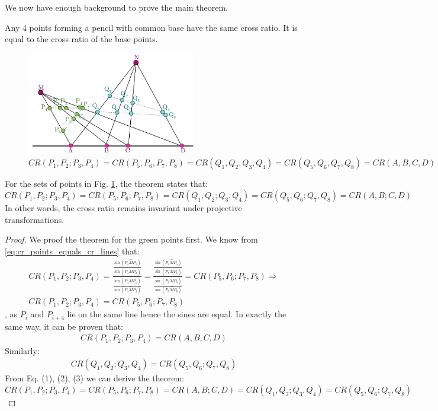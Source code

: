 \documentclass[a4paper]{article}
\begin{document}
We now have enough background to prove the main theorem.
\begin{theorem}
Any 4 points forming a pencil with common base have the same cross ratio. It is equal to the cross ratio of the base points.
\begin{figure}[H]
    \centering
    \includegraphics[height=4.5cm]{img/cross_ratio_pencils.png}
    \caption{$CR(P_1,P_2;P_3,P_4) = CR(P_5,P_6,P_7,P_8) =CR(Q_1,Q_2,Q_3,Q_4) = CR(Q_5,Q_6,Q_7,Q_8) = CR(A,B,C,D)$}
    \label{fig:cross_ratio_pencil}
\end{figure}
For the sets of points in Fig. \ref{fig:cross_ratio_pencil}, the theorem states that:
\begin{equation}
    CR(P_1,P_2;P_3,P_4) = CR(P_5,P_6;P_7,P_8) =CR(Q_1,Q_2;Q_3,Q_4) = CR(Q_5,Q_6;Q_7,Q_8) = CR(A,B;C,D)
\end{equation}
In other words, the cross ratio remains invariant under projective transformations.
\end{theorem}
\begin{proof}
We proof the theorem for the green points first. We know from \eqref{eq:cr_points_equals_cr_lines} that:
\begin{gather}
CR(P_1,P_2;P_3,P_4) =
\frac{\frac{\sin(P_3\hat{M}P_1)}{\sin(P_3\hat{M}P_2)}}   {\frac{\sin(P_4\hat{M}P_1)}{\sin(P_4\hat{M}P_2)}} = 
\frac{\frac{\sin(P_7\hat{M}P_5)}{\sin(P_8\hat{M}P_6)}}   {\frac{\sin(P_8\hat{M}P_5)}{\sin(P_8\hat{M}P_6)}} = 
CR(P_5,P_6;P_7,P_8) \Rightarrow \\
CR(P_1,P_2;P_3,P_4) = CR(P_5,P_6;P_7,P_8) \tag{1}
\end{gather}
, as $P_i$ and $P_{i+4}$ lie on the same line hence the sines are equal. In exactly the same way, it can be proven that:
\begin{gather}
CR(P_1,P_2;P_3,P_4) = CR(A,B,C,D)  \tag{2}  
\end{gather}
Similarly:
\begin{gather}
CR(Q_1,Q_2;Q_3,Q_4) = CR(Q_5,Q_6;Q_7,Q_8) \tag{3}
\end{gather}
From Eq. (1), (2), (3) we can derive the theorem:
\[
CR(P_1,P_2;P_3,P_4) = CR(P_5,P_6;P_7,P_8) = CR(A,B;C,D) = CR(Q_1,Q_2;Q_3,Q_4) = CR(Q_5,Q_6;Q_7,Q_8) 
\]
\end{proof}
\end{document}
